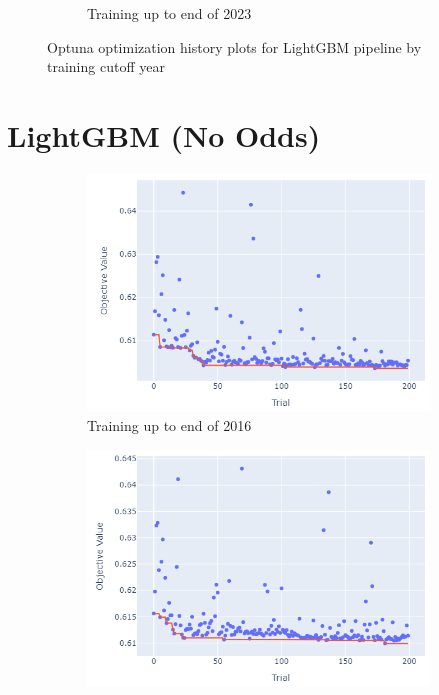 \documentclass[12pt,twoside]{report}
\begin{document}
\begin{figure}[htb]
\begin{subfigure}{.33\linewidth}
  \caption{Training up to end of 2023}
\end{subfigure}
\par\bigskip
\caption{Optuna optimization history plots for LightGBM pipeline by training cutoff year}
\end{figure}

\newpage
\section{LightGBM (No Odds)}

\begin{figure}[htb]
\centering
\captionsetup{justification=centering}
\begin{subfigure}{.33\linewidth}
  \centering
  \includegraphics[width=0.95\linewidth]{figures/lightgbm_no_odds_cutoff_2016.png}
  \caption{Training up to end of 2016}
\end{subfigure}%
\begin{subfigure}{.33\linewidth}
  \centering
  \includegraphics[width=0.95\linewidth]{figures/lightgbm_no_odds_cutoff_2017.png}

\end{subfigure}
\end{figure}
\end{document}
